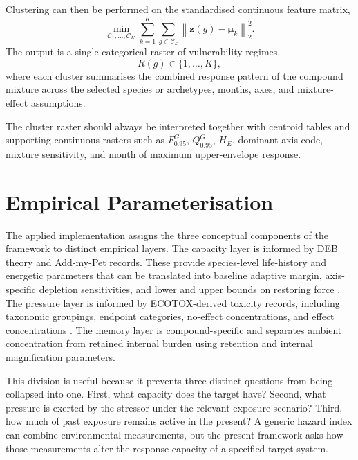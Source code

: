 Clustering can then be performed on the standardised continuous feature matrix,
\begin{equation}
  \min_{\mathcal{C}_1,\ldots,\mathcal{C}_K}\sum_{k=1}^{K}\sum_{g\in\mathcal{C}_k}\left\|\widetilde{\bm z}(g)-\bm\mu_k\right\|_2^2.
\end{equation}
The output is a single categorical raster of vulnerability regimes,
\begin{equation}
  R(g)\in\{1,\ldots,K\},
\end{equation}
where each cluster summarises the combined response pattern of the compound mixture across the selected species or archetypes, months, axes, and mixture-effect assumptions.

\begin{center}
\drawClusterRaster
\end{center}

The cluster raster should always be interpreted together with centroid tables and supporting continuous rasters such as $F_{0.95}^G$, $Q_{0.95}^G$, $H_E$, dominant-axis code, mixture sensitivity, and month of maximum upper-envelope response.

\section{Empirical Parameterisation}
\label{sec:empirical_parameterisation}

The applied implementation assigns the three conceptual components of the framework to distinct empirical layers. The capacity layer is informed by DEB theory and Add-my-Pet records. These provide species-level life-history and energetic parameters that can be translated into baseline adaptive margin, axis-specific depletion sensitivities, and lower and upper bounds on restoring force \citep{kooijman2010deb,marques2018amp}. The pressure layer is informed by ECOTOX-derived toxicity records, including taxonomic groupings, endpoint categories, no-effect concentrations, and effect concentrations \citep{olker2022ecotox}. The memory layer is compound-specific and separates ambient concentration from retained internal burden using retention and internal magnification parameters.

This division is useful because it prevents three distinct questions from being collapsed into one. First, what capacity does the target have? Second, what pressure is exerted by the stressor under the relevant exposure scenario? Third, how much of past exposure remains active in the present? A generic hazard index can combine environmental measurements, but the present framework asks how those measurements alter the response capacity of a specified target system.

